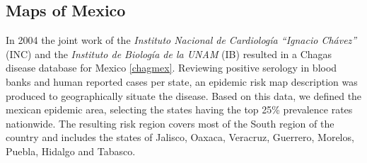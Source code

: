 \subsection{Maps of Mexico}

In 2004 the joint work of the \textit{Instituto Nacional de Cardiología “Ignacio Chávez”} (INC) and the \textit{Instituto de Biología de la UNAM } (IB) resulted in a Chagas disease database for Mexico \ref{chagmex}. Reviewing positive serology in blood banks and human reported cases per state, an epidemic risk map description was produced to geographically situate the disease. Based on this data, we defined the mexican epidemic area, selecting the states having the top 25\% prevalence rates nationwide. The resulting risk region covers most of the South region of the country and includes the states of Jalisco, Oaxaca, Veracruz, Guerrero, Morelos, Puebla, Hidalgo and Tabasco.

